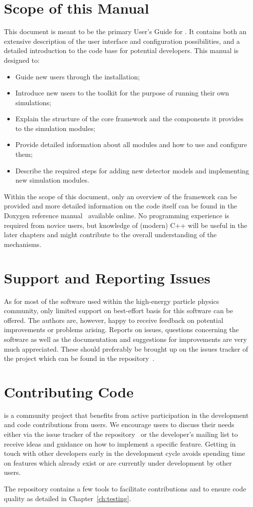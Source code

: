 \section{Scope of this Manual}
This document is meant to be the primary User's Guide for \apsq.
It contains both an extensive description of the user interface and configuration possibilities, and a detailed introduction to the code base for potential developers.
This manual is designed to:
\begin{itemize}
\item Guide new users through the installation;
\item Introduce new users to the toolkit for the purpose of running their own simulations;
\item Explain the structure of the core framework and the components it provides to the simulation modules;
\item Provide detailed information about all modules and how to use and configure them;
\item Describe the required steps for adding new detector models and implementing new simulation modules.
\end{itemize}

Within the scope of this document, only an overview of the framework can be provided and more detailed information on the code itself can be found in the Doxygen reference manual~\cite{ap2-doxygen} available online.
No programming experience is required from novice users, but knowledge of (modern) C++ will be useful in the later chapters and might contribute to the overall understanding of the mechanisms.

\section{Support and Reporting Issues}
As for most of the software used within the high-energy particle physics community, only limited support on best-effort basis for this software can be offered.
The authors are, however, happy to receive feedback on potential improvements or problems arising.
Reports on issues, questions concerning the software as well as the documentation and suggestions for improvements are very much appreciated.
These should preferably be brought up on the issues tracker of the project which can be found in the repository~\cite{ap2-issue-tracker}.


\section{Contributing Code}
\apsq is a community project that benefits from active participation in the development and code contributions from users.
We encourage users to discuss their needs either via the issue tracker of the repository~\cite{ap2-issue-tracker} or the developer's mailing list to receive ideas and guidance on how to implement a specific feature.
Getting in touch with other developers early in the development cycle avoids spending time on features which already exist or are currently under development by other users.

The repository contains a few tools to facilitate contributions and to ensure code quality as detailed in Chapter~\ref{ch:testing}.
